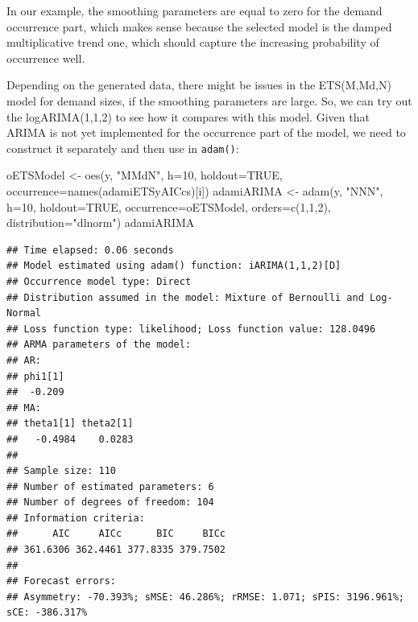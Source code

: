 \documentclass[
]{book}
\newenvironment{Shaded}{\begin{snugshade}}{\end{snugshade}}
\newcommand{\AttributeTok}[1]{\textcolor[rgb]{0.77,0.63,0.00}{#1}}
\newcommand{\ConstantTok}[1]{\textcolor[rgb]{0.00,0.00,0.00}{#1}}
\newcommand{\DecValTok}[1]{\textcolor[rgb]{0.00,0.00,0.81}{#1}}
\newcommand{\FunctionTok}[1]{\textcolor[rgb]{0.00,0.00,0.00}{#1}}
\newcommand{\NormalTok}[1]{#1}
\newcommand{\OtherTok}[1]{\textcolor[rgb]{0.56,0.35,0.01}{#1}}
\newcommand{\StringTok}[1]{\textcolor[rgb]{0.31,0.60,0.02}{#1}}
\theoremstyle{definition}
\theoremstyle{definition}
\theoremstyle{definition}
\theoremstyle{definition}
\theoremstyle{remark}
\begin{document}
In our example, the smoothing parameters are equal to zero for the demand occurrence part, which makes sense because the selected model is the damped multiplicative trend one, which should capture the increasing probability of occurrence well.

Depending on the generated data, there might be issues in the ETS(M,Md,N) model for demand sizes, if the smoothing parameters are large. So, we can try out the logARIMA(1,1,2) to see how it compares with this model. Given that ARIMA is not yet implemented for the occurrence part of the model, we need to construct it separately and then use in \texttt{adam()}:

\begin{Shaded}
\begin{Highlighting}[]
\NormalTok{oETSModel }\OtherTok{\textless{}{-}} \FunctionTok{oes}\NormalTok{(y, }\StringTok{"MMdN"}\NormalTok{, }\AttributeTok{h=}\DecValTok{10}\NormalTok{, }\AttributeTok{holdout=}\ConstantTok{TRUE}\NormalTok{,}
                 \AttributeTok{occurrence=}\FunctionTok{names}\NormalTok{(adamiETSyAICcs)[i])}
\NormalTok{adamiARIMA }\OtherTok{\textless{}{-}} \FunctionTok{adam}\NormalTok{(y, }\StringTok{"NNN"}\NormalTok{, }\AttributeTok{h=}\DecValTok{10}\NormalTok{, }\AttributeTok{holdout=}\ConstantTok{TRUE}\NormalTok{,}
                   \AttributeTok{occurrence=}\NormalTok{oETSModel,}
                   \AttributeTok{orders=}\FunctionTok{c}\NormalTok{(}\DecValTok{1}\NormalTok{,}\DecValTok{1}\NormalTok{,}\DecValTok{2}\NormalTok{),}
                   \AttributeTok{distribution=}\StringTok{"dlnorm"}\NormalTok{)}
\NormalTok{adamiARIMA}
\end{Highlighting}
\end{Shaded}

\begin{verbatim}
## Time elapsed: 0.06 seconds
## Model estimated using adam() function: iARIMA(1,1,2)[D]
## Occurrence model type: Direct
## Distribution assumed in the model: Mixture of Bernoulli and Log-Normal
## Loss function type: likelihood; Loss function value: 128.0496
## ARMA parameters of the model:
## AR:
## phi1[1] 
##  -0.209 
## MA:
## theta1[1] theta2[1] 
##   -0.4984    0.0283 
## 
## Sample size: 110
## Number of estimated parameters: 6
## Number of degrees of freedom: 104
## Information criteria:
##      AIC     AICc      BIC     BICc 
## 361.6306 362.4461 377.8335 379.7502 
## 
## Forecast errors:
## Asymmetry: -70.393%; sMSE: 46.286%; rRMSE: 1.071; sPIS: 3196.961%; sCE: -386.317%
\end{verbatim}
\end{document}
